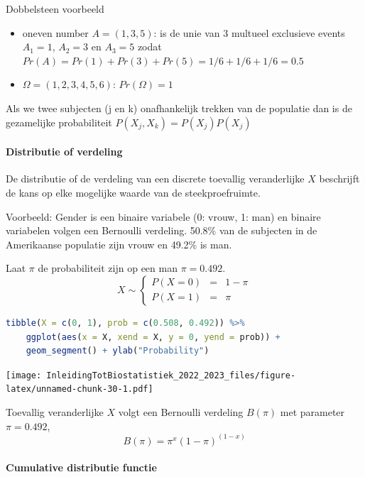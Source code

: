 \documentclass[
  12pt,dutch,coursenotes]{book}
\providecommand{\tightlist}{%
  \setlength{\itemsep}{0pt}\setlength{\parskip}{0pt}}
\begin{document}
Dobbelsteen voorbeeld

\begin{itemize}
\tightlist
\item
  oneven number \(A=(1,3,5)\): is de unie van 3 multueel exclusieve events \(A_1=1\), \(A_2=3\) en \(A_3=5\) zodat
  \(Pr(A)=Pr(1)+Pr(3)+Pr(5)=1/6+1/6+1/6=0.5\)
\item
  \(\Omega=(1,2,3,4,5,6)\): \(Pr(\Omega)=1\)
\end{itemize}

Als we twee subjecten (j en k) onafhankelijk trekken van de populatie dan is de gezamelijke probabiliteit
\(P(X_j,X_k)= P(X_j)P(X_j)\)

\hypertarget{distributie-of-verdeling}{%
\paragraph{Distributie of verdeling}\label{distributie-of-verdeling}}

De distributie of de verdeling van een discrete toevallig veranderlijke \(X\) beschrijft de kans op elke mogelijke waarde van de steekproefruimte.

Voorbeeld: Gender is een binaire variabele (0: vrouw, 1: man) en binaire variabelen volgen een Bernoulli verdeling. 50.8\% van de subjecten in de Amerikaanse populatie zijn vrouw en 49.2\% is man.

Laat \(\pi\) de probabiliteit zijn op een man \(\pi=0.492\).
\[ X\sim \left \{
    \begin{array}{lcl}
    P(X=0) &=& 1-\pi\\
    P(X=1) &=& \pi
    \end{array} \right . \]

\begin{lstlisting}[language=R]
tibble(X = c(0, 1), prob = c(0.508, 0.492)) %>%
    ggplot(aes(x = X, xend = X, y = 0, yend = prob)) +
    geom_segment() + ylab("Probability")
\end{lstlisting}

\texttt{[image: InleidingTotBiostatistiek\_2022\_2023\_files/figure-latex/unnamed-chunk-30-1.pdf]}

Toevallig veranderlijke \(X\) volgt een Bernoulli verdeling \(B(\pi)\) met parameter \(\pi=0.492\),
\[B(\pi)= \pi^x(1-\pi)^{(1-x)}\]

\hypertarget{cumulative-distributie-functie}{%
\paragraph{Cumulative distributie functie}\label{cumulative-distributie-functie}}
\end{document}
